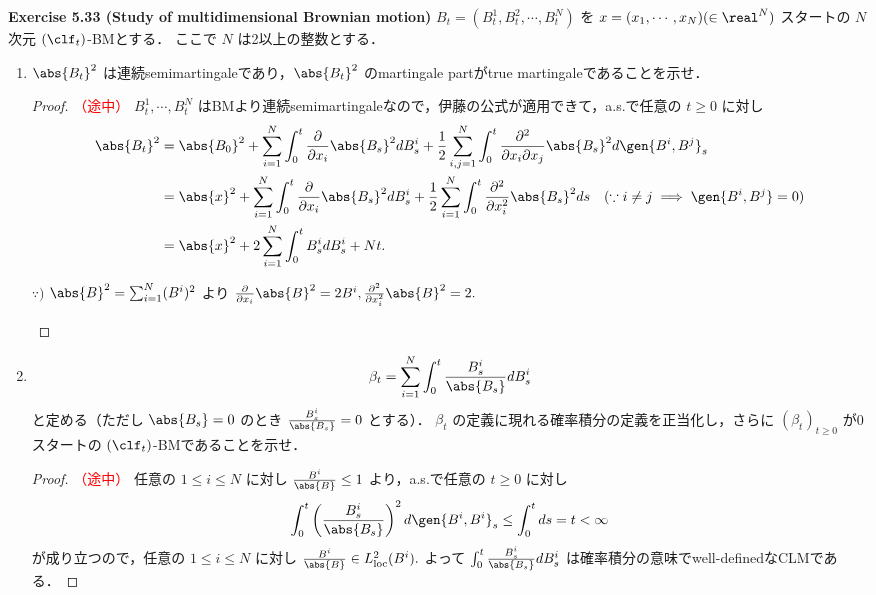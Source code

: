 \documentclass{jsarticle}
\begin{document}
\textbf{Exercise 5.33 (Study of multidimensional Brownian motion)}
$B_t=(B_t^{1},B_t^{2},\dotsb,B_t^{N})$ を $x=(x_1,\dotsb,x_N)(\in\real^N)$ スタートの $N$ 次元 $(\clf_t)$-BMとする．
ここで $N$ は2以上の整数とする．
\begin{enumerate}
    \item
    $\abs{B_t}^2$ は連続semimartingaleであり，$\abs{B_t}^2$ のmartingale partがtrue martingaleであることを示せ．
    \begin{proof}\textcolor{red}{（途中）}
        $B_t^{1},\dotsb,B_t^{N}$ はBMより連続semimartingaleなので，伊藤の公式が適用できて，a.s.で任意の $t\ge0$ に対し
        \begin{align}
            \abs{B_t}^2
            &= \abs{B_0}^2
            + \sum_{i=1}^{N}\int_{0}^{t}\frac{\partial}{\partial x_i}\abs{B_s}^2 dB_s^i
            + \frac{1}{2}\sum_{i,j=1}^{N}\int_{0}^{t}\frac{\partial^2}{\partial x_i\partial x_j}\abs{B_s}^2 d\gen{B^i,B^j}_s \\
            &= \abs{x}^2
            + \sum_{i=1}^{N}\int_{0}^{t}\frac{\partial}{\partial x_i}\abs{B_s}^2 dB_s^i
            + \frac{1}{2}\sum_{i=1}^{N}\int_{0}^{t}\frac{\partial^2}{\partial x_i^2}\abs{B_s}^2 ds
            \quad(\because i\neq j\implies\gen{B^i,B^j}=0)\\
            &= \abs{x}^2
            + 2\sum_{i=1}^{N}\int_{0}^{t}B_s^i dB_s^i
            + Nt.
        \end{align}
        \begin{screen}
            $\because)$ $\abs{B}^2=\sum_{i=1}^{N}(B^i)^2$ より $\frac{\partial}{\partial x_i}\abs{B}^2=2B^i, \frac{\partial^2}{\partial x_i^2}\abs{B}^2=2.$
        \end{screen}
    \end{proof}
    
    \item
    \begin{align}
        \beta_t
        = \sum_{i=1}^{N}\int_{0}^{t}\frac{B_{s}^{i}}{\abs{B_s}}dB_s^i
    \end{align}
    と定める（ただし $\abs{B_s}=0$ のとき $\frac{B_{s}^{i}}{\abs{B_s}}=0$ とする）．
    $\beta_t$ の定義に現れる確率積分の定義を正当化し，さらに $(\beta_t)_{t\ge0}$ が0スタートの $(\clf_t)$-BMであることを示せ．
    \begin{proof}\textcolor{red}{（途中）}
        任意の $1\le i\le N$ に対し $\frac{B^i}{\abs{B}}\le1$ より，a.s.で任意の $t\ge0$ に対し
        \begin{align}
            \int_0^t \left(\frac{B_s^i}{\abs{B_s}}\right)^2 d\gen{B^i, B^i}_s
            \le \int_0^t ds = t < \infty
        \end{align}
        が成り立つので，任意の $1\le i\le N$ に対し $\frac{B^i}{\abs{B}}\in L_{\mathrm{loc}}^2(B^i).$
        よって $\int_{0}^{t}\frac{B_{s}^{i}}{\abs{B_s}}dB_s^i$ は確率積分の意味でwell-definedなCLMである．


\end{proof}
\end{enumerate}
\end{document}
